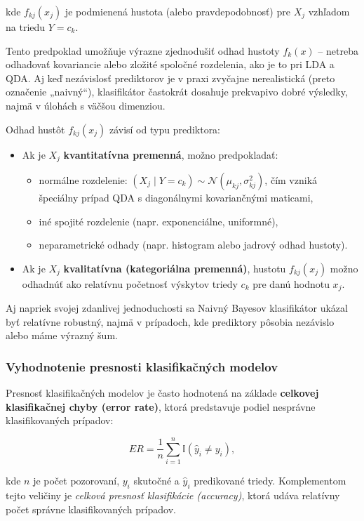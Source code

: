 kde $f_{kj}(x_j)$ je podmienená hustota (alebo pravdepodobnosť) pre $X_j$ vzhľadom na triedu $Y = c_k$.

Tento predpoklad umožňuje výrazne zjednodušiť odhad hustoty $f_k(x)$ – netreba odhadovať kovariancie alebo zložité spoločné rozdelenia, ako je to pri LDA a QDA. Aj keď nezávislosť prediktorov je v praxi zvyčajne nerealistická (preto označenie „naivný“), klasifikátor častokrát dosahuje prekvapivo dobré výsledky, najmä v úlohách s väčšou dimenziou.

\medskip
\noindent
Odhad hustôt $f_{kj}(x_j)$ závisí od typu prediktora:
\begin{itemize}
  \item Ak je $X_j$ \textbf{kvantitatívna premenná}, možno predpokladať:
  \begin{itemize}
    \item normálne rozdelenie: $(X_j \mid Y = c_k) \sim \mathcal{N}(\mu_{kj}, \sigma^2_{kj})$, čím vzniká špeciálny prípad QDA s diagonálnymi kovariančnými maticami,
    \item iné spojité rozdelenie (napr. exponenciálne, uniformné),
    \item neparametrické odhady (napr. histogram alebo jadrový odhad hustoty).
  \end{itemize}
  \item Ak je $X_j$ \textbf{kvalitatívna (kategoriálna premenná)}, hustotu $f_{kj}(x_j)$ možno odhadnúť ako relatívnu početnosť výskytov triedy $c_k$ pre danú hodnotu $x_j$.
\end{itemize}

\noindent
Aj napriek svojej zdanlivej jednoduchosti sa Naivný Bayesov klasifikátor ukázal byť relatívne robustný, najmä v prípadoch, kde prediktory pôsobia nezávislo alebo máme výrazný šum.

\subsubsection{Vyhodnotenie presnosti klasifikačných modelov}

Presnosť klasifikačných modelov je často hodnotená na základe \textbf{celkovej klasifikačnej chyby (error rate)}, ktorá predstavuje podiel nesprávne klasifikovaných prípadov:

\begin{equation}
ER = \frac{1}{n} \sum_{i=1}^{n} \mathbb{I}(\hat{y}_i \neq y_i),
\end{equation}

kde $n$ je počet pozorovaní, $y_i$ skutočné a $\hat{y}_i$ predikované triedy. Komplementom tejto veličiny je \textit{celková presnosť klasifikácie (accuracy)}, ktorá udáva relatívny počet správne klasifikovaných prípadov.

